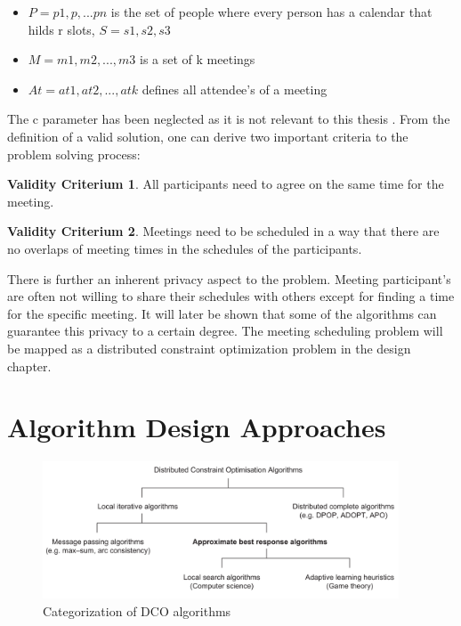 \begin{itemize}
\item \(P = {p1, p, ... pn}\) is the set of people where every person has a calendar that hilds r slots, \(S = {s1,s2,s3}\)
\item \(M = {m1, m2, ..., m3}\) is a set of k meetings
\item \(At = {at1, at2, ..., atk}\) defines all attendee's of a meeting
\end{itemize}

The c parameter has been neglected as it is not relevant to this thesis \cite{angulo}. From the definition of a valid solution, one can derive two important criteria to the problem solving process:
\theoremstyle{definition}
\newtheorem{hardconstraint1}{Validity Criterium}
\begin{hardconstraint1}
All participants need to agree on the same time for the meeting.
\end{hardconstraint1}
\begin{hardconstraint1}
Meetings need to be scheduled in a way that there are no overlaps of meeting times in the schedules of the participants.
\end{hardconstraint1}
    
There is further an inherent privacy aspect to the problem. Meeting participant's are often not willing to share their schedules with others except for finding a time for the specific meeting. It will later be shown that some of the algorithms can guarantee this privacy to a certain degree. The meeting scheduling problem will be mapped as a distributed constraint optimization problem in the design chapter\cite{Farinelli, Angulo}.
    
   
    

\section{Algorithm Design Approaches}

\begin{figure}[h]
\includegraphics[width=400px]{graphics/overview_algos}
\caption{Categorization of DCO algorithms \cite{Chapman2011}}
\label{fig:categorization}
\end{figure}

